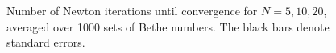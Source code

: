\documentclass[11pt, a4paper]{report} %
\begin{document}
\begin{figure}[ph]
  \centering
  \\
  \\
  \caption{Number of Newton iterations until convergence for \(N=5,10,20\), averaged over 1000 sets of Bethe numbers. The black bars denote standard errors.}\label{fig:iterations}
\end{figure}
\end{document}
